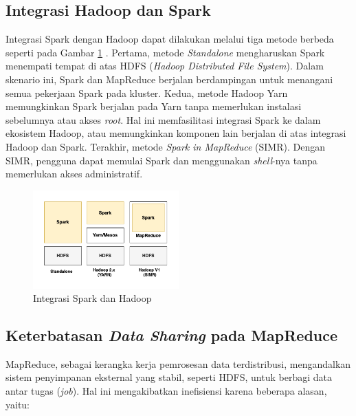 \subsection{Integrasi Hadoop dan Spark}
Integrasi Spark dengan Hadoop dapat dilakukan melalui tiga metode berbeda seperti pada Gambar \ref{fig:spark-x-hadoop}  \cite{ApacheSparkIntroduction}. Pertama, metode \textit{Standalone} mengharuskan Spark menempati tempat di atas HDFS (\textit{Hadoop Distributed File System}). Dalam skenario ini, Spark dan MapReduce berjalan berdampingan untuk menangani semua pekerjaan Spark pada kluster. Kedua, metode Hadoop Yarn memungkinkan Spark berjalan pada Yarn tanpa memerlukan instalasi sebelumnya atau akses \textit{root}. Hal ini memfasilitasi integrasi Spark ke dalam ekosistem Hadoop, atau memungkinkan komponen lain berjalan di atas integrasi Hadoop dan Spark. Terakhir, metode \textit{Spark in MapReduce} (SIMR). Dengan SIMR, pengguna dapat memulai Spark dan menggunakan \textit{shell}-nya tanpa memerlukan akses administratif. 

\begin{figure}[h!]
    \centering
    \includegraphics[width=0.5\textwidth]{figures/ch02/sparkxhadoop}
    \caption{Integrasi Spark dan Hadoop}
    \label{fig:spark-x-hadoop}
\end{figure}

\subsection{Keterbatasan \textit{Data Sharing} pada MapReduce}

MapReduce, sebagai kerangka kerja pemrosesan data terdistribusi, mengandalkan sistem penyimpanan eksternal yang stabil, seperti HDFS, untuk berbagi data antar tugas (\textit{job}). Hal ini mengakibatkan inefisiensi karena beberapa alasan, yaitu:


